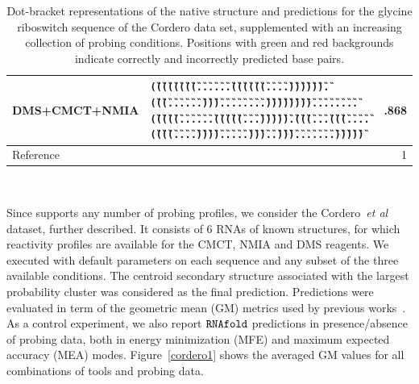 \documentclass[a4,center,fleqn]{NAR}
\begin{document}
\begin{table}
\begin{adjustbox}{max width=\linewidth}
\begin{tabular}{@{}llr@{}}
			DMS+CMCT+NMIA & {\tt \G{(}\G{(}\G{(}\G{(}\G{(}\G{(}\G{(}\G{(}\G{.}\G{.}\G{.}\G{.}\G{.}\G{.}\G{(}\G{(}\G{(}\G{(}\G{(}\G{(}\G{.}\G{.}\G{.}\G{.}\G{)}\G{)}\G{)}\G{)}\G{)}\G{)}\G{.}\G{(}\G{(}\G{(}\B{(}\B{(}\B{(}\B{(}\B{(}\B{.}\B{.}\G{.}\G{.}\G{.}\G{.}\B{)}\B{)}\B{)}\B{)}\B{)}\G{.}\G{.}\G{)}\G{)}\G{)}\G{.}\G{.}\G{.}\G{.}\G{.}\G{.}\G{.}\G{.}\G{)}\G{)}\G{)}\G{)}\G{)}\G{)}\G{)}\G{)}\G{.}\G{.}\G{.}\G{.}\G{.}\G{.}\G{.}\G{.}\G{(}\G{(}\G{(}\G{(}\G{(}\G{.}\G{.}\G{.}\G{.}\G{.}\G{.}\G{(}\G{(}\G{(}\G{(}\G{(}\B{(}\G{.}\G{.}\G{.}\B{)}\G{)}\G{)}\G{)}\G{)}\G{)}\G{.}\G{(}\G{(}\G{(}\G{.}\G{.}\G{.}\B{(}\G{(}\G{(}\G{(}\G{.}\G{.}\G{.}\G{.}\G{(}\G{(}\G{(}\G{(}\G{.}\G{.}\G{.}\G{.}\G{)}\G{)}\G{)}\G{)}\G{.}\G{.}\G{.}\G{.}\G{.}\G{)}\G{)}\G{)}\B{)}\G{.}\G{.}\G{)}\G{)}\G{)}\G{.}\G{.}\G{.}\G{.}\G{.}\G{.}\G{.}\G{)}\G{)}\G{)}\G{)}\G{)}} & \textbf{.868}\\ \midrule
			Reference& {\tt \Base{((((((((......((((((....)))))).(((....(((.....)))...)))........))))))))........(((((......(((((.....))))).(((....(((....((((....)))).....)))...))).......)))))}}& 1\\
			\bottomrule
		\end{tabular}
	\end{adjustbox}\\
	\caption{Dot-bracket representations of the native structure and \OurTool{} predictions for the glycine riboswitch sequence of the Cordero\etal\cite{Cordero2012} data set, supplemented with an increasing collection of probing conditions. Positions with green and red backgrounds indicate correctly and incorrectly predicted base pairs.}\label{fig:glycine_example}
\end{table}


Since \OurTool{} supports any number of probing profiles, we consider the Cordero~\emph{et al} dataset, further described. It consists of 6 RNAs of known structures, for which reactivity profiles are available for the CMCT, NMIA and DMS reagents. We executed \OurTool{} with default parameters on each sequence and any subset of the three available conditions. The centroid secondary structure  associated with the largest probability cluster was considered as the final prediction. Predictions were evaluated in term of the geometric mean (GM) metrics used by previous works~\cite{Spasic2017}.
As a control experiment, we also report ${\tt RNAfold}$ predictions in presence/absence of probing data, both in energy minimization (MFE) and maximum expected accuracy (MEA) modes. Figure~\ref{cordero1} shows the averaged GM values for all combinations of tools and probing data.
\end{document}
